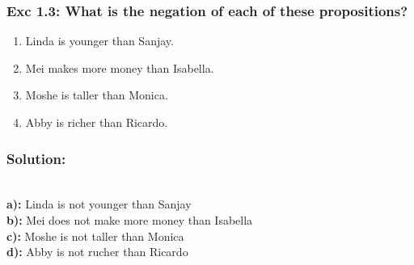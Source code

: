 \subsubsection*{Exc 1.3: What is the negation of each of these propositions?}
\begin{enumerate}[label=(\alph*)]
\item Linda is younger than Sanjay.
\item Mei makes more money than Isabella.
\item Moshe is taller than Monica.
\item Abby is richer than Ricardo.
\end{enumerate}
\subsubsection*{Solution:}
\\
\textbf{a):} Linda is not younger than Sanjay
\\
\textbf{b):} Mei does not make more money than Isabella
\\
\textbf{c):} Moshe is not taller than Monica
\\
\textbf{d):} Abby is not rucher than Ricardo

